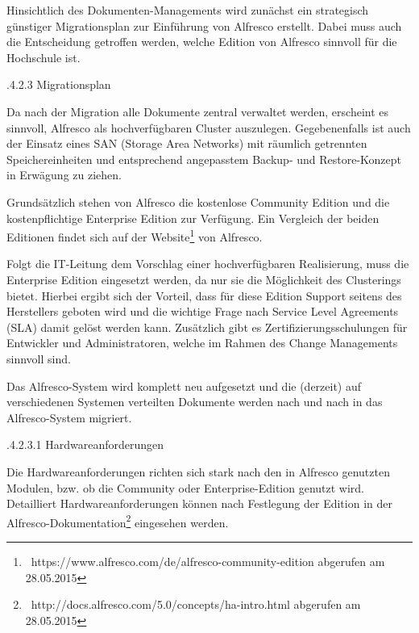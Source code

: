 \documentclass[a4paper]{article}
\begin{document}
\bigskip

{\sffamily
Hinsichtlich des Dokumenten-Managements wird zunächst ein strategisch günstiger Migrationsplan zur Einführung von
Alfresco erstellt. Dabei muss auch die Entscheidung getroffen werden, welche Edition von Alfresco sinnvoll für die
Hochschule ist.}


\bigskip

{.4.2.3 Migrationsplan}


\bigskip

{\sffamily
Da nach der Migration alle Dokumente zentral verwaltet werden, erscheint es sinnvoll, Alfresco als hochverfügbaren
Cluster auszulegen. Gegebenenfalls ist auch der Einsatz eines SAN (Storage Area Networks) mit räumlich getrennten
Speichereinheiten und entsprechend angepasstem Backup- und Restore-Konzept in Erwägung zu ziehen.}


\bigskip

{\sffamily
Grundsätzlich stehen von Alfresco die kostenlose Community Edition und die kostenpflichtige Enterprise Edition zur
Verfügung. Ein Vergleich der beiden Editionen findet sich auf der
Website\footnote{\ https://www.alfresco.com/de/alfresco-community-edition abgerufen am 28.05.2015} von Alfresco.}


\bigskip

{\sffamily
Folgt die IT-Leitung dem Vorschlag einer hochverfügbaren Realisierung, muss die Enterprise Edition eingesetzt werden, da
nur sie die Möglichkeit des Clusterings bietet. Hierbei ergibt sich der Vorteil, dass für diese Edition Support seitens
des Herstellers geboten wird und die wichtige Frage nach Service Level Agreements (SLA) damit gelöst werden kann.
Zusätzlich gibt es Zertifizierungsschulungen für Entwickler und Administratoren, welche im Rahmen des Change
Managements sinnvoll sind.}


\bigskip

{\sffamily
Das Alfresco-System wird komplett neu aufgesetzt und die (derzeit) auf verschiedenen Systemen verteilten Dokumente
werden nach und nach in das Alfresco-System migriert.}


\bigskip

{.4.2.3.1 Hardwareanforderungen}


\bigskip

{\sffamily
Die Hardwareanforderungen richten sich stark nach den in Alfresco genutzten Modulen, bzw. ob die Community oder
Enterprise-Edition genutzt wird. Detailliert Hardwareanforderungen können nach Festlegung der Edition in der
Alfresco-Dokumentation\footnote{\ http://docs.alfresco.com/5.0/concepts/ha-intro.html abgerufen am 28.05.2015}
eingesehen werden. }
\end{document}
